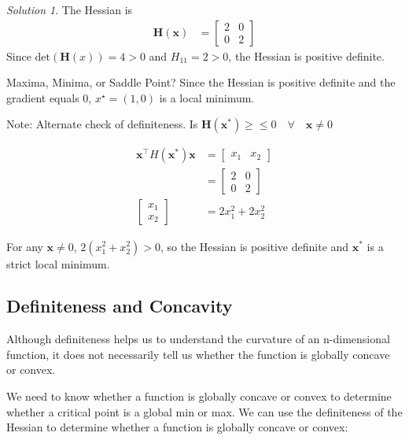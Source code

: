 \documentclass[
  letterpaper,
]{book}
\theoremstyle{definition}
\theoremstyle{definition}
\theoremstyle{plain}
\theoremstyle{definition}
\theoremstyle{plain}
\theoremstyle{plain}
\theoremstyle{remark}
\newtheorem*{solution}{Solution}
\begin{document}
\begin{solution}

The Hessian is \begin{align*}
\mathbf{H(x)} &= \begin{bmatrix} 2&0\\0&2 \end{bmatrix}
\end{align*} Since \(\mathrm{det}(\mathbf{H}(x)) = 4 > 0\) and
\(H_{11}=2>0\), the Hessian is positive definite.

Maxima, Minima, or Saddle Point? Since the Hessian is positive definite
and the gradient equals 0, \(x^\star = (1,0)\) is a local minimum.

Note: Alternate check of definiteness. Is
\(\mathbf{H(x^*)} \geq \leq 0 \quad \forall \quad \mathbf{x}\ne 0\)

\begin{align*}
\mathbf{x}^\top H(\mathbf{x}^*) \mathbf{x} &= \begin{bmatrix} x_1 & x_2 \end{bmatrix}\\
&= \begin{bmatrix} 2&0\\0&2 \end{bmatrix}\\
\begin{bmatrix} x_1\\x_2\end{bmatrix} &= 2x_1^2+2x_2^2
\end{align*}

For any \(\mathbf{x}\ne 0\), \(2(x_1^2+x_2^2)>0\), so the Hessian is
positive definite and \(\mathbf{x}^*\) is a strict local minimum.

\end{solution}

\hypertarget{definiteness-and-concavity}{%
\subsection*{Definiteness and
Concavity}\label{definiteness-and-concavity}}

Although definiteness helps us to understand the curvature of an
n-dimensional function, it does not necessarily tell us whether the
function is globally concave or convex.

We need to know whether a function is globally concave or convex to
determine whether a critical point is a global min or max. We can use
the definiteness of the Hessian to determine whether a function is
globally concave or convex:
\end{document}

